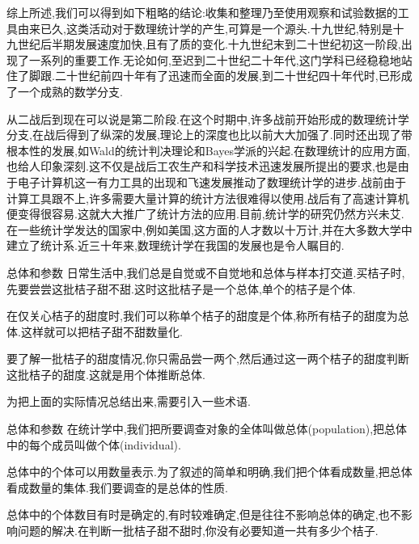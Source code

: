 \begin{frame}
	综上所述,我们可以得到如下粗略的结论:收集和整理乃至使用观察和试验数据的工具由来已久,这类活动对于数理统计学的产生,可算是一个源头.十九世纪,特别是十九世纪后半期发展速度加快,且有了质的变化.十九世纪末到二十世纪初这一阶段,出现了一系列的重要工作.无论如何,至迟到二十世纪二十年代,这门学科已经稳稳地站住了脚跟.二十世纪前四十年有了迅速而全面的发展,到二十世纪四十年代时,已形成了一个成熟的数学分支.
	
	从二战后到现在可以说是第二阶段.在这个时期中,许多战前开始形成的数理统计学分支,在战后得到了纵深的发展,理论上的深度也比以前大大加强了.同时还出现了带根本性的发展,如Wald的统计判决理论和Bayes学派的兴起.在数理统计的应用方面,也给人印象深刻.这不仅是战后工农生产和科学技术迅速发展所提出的要求,也是由于电子计算机这一有力工具的出现和飞速发展推动了数理统计学的进步.战前由于计算工具跟不上,许多需要大量计算的统计方法很难得以使用.战后有了高速计算机便变得很容易.这就大大推广了统计方法的应用.目前,统计学的研究仍然方兴未艾.在一些统计学发达的国家中,例如美国,这方面的人才数以十万计,并在大多数大学中建立了统计系.近三十年来,数理统计学在我国的发展也是令人瞩目的.
\end{frame}

\begin{frame}{总体和参数}
日常生活中,我们总是自觉或不自觉地和总体与样本打交道.买桔子时,先要尝尝这批桔子甜不甜.这时这批桔子是一个总体,单个的桔子是个体.

在仅关心桔子的甜度时,我们可以称单个桔子的甜度是个体,称所有桔子的甜度为总体.这样就可以把桔子甜不甜数量化.

要了解一批桔子的甜度情况,你只需品尝一两个,然后通过这一两个桔子的甜度判断这批桔子的甜度.这就是用个体推断总体.

为把上面的实际情况总结出来,需要引入一些术语.
\end{frame}

\begin{frame}{总体和参数}
在统计学中,我们把所要调查对象的全体叫做\alert{总体}(population),把总体中的每个成员叫做\alert{个体}(individual).

总体中的个体可以用数量表示.为了叙述的简单和明确,我们把个体看成数量,把总体看成数量的集体.我们要调查的是总体的性质.

总体中的个体数目有时是确定的,有时较难确定,但是往往不影响总体的确定,也不影响问题的解决.在判断一批桔子甜不甜时,你没有必要知道一共有多少个桔子.
\end{frame}

